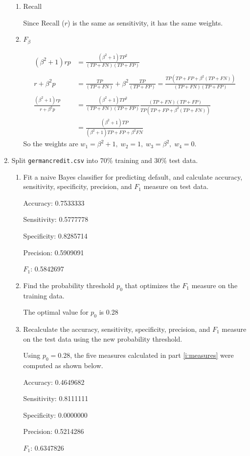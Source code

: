 \documentclass[11pt]{article}
\begin{document}
\begin{enumerate}
\begin{enumerate}
    \item Recall

          Since Recall ($r$) is the same as sensitivity, it has the same weights. 

    \item $F_\beta$

$$
\begin{array}{rl}
         (\beta^2 + 1)rp &= \frac{(\beta^2 + 1)TP^2}{(TP + FN)(TP + FP)}\\
& \\
         r + \beta^2p & = \frac{TP}{(TP + FN)} + \beta^2\frac{TP}{(TP + FP)} = \frac{TP(TP + FP + \beta^2(TP + FN)) }{(TP + FN)(TP + FP)}\\
&\\
\frac{(\beta^2 + 1)rp}{r + \beta^2 p} &= \frac{(\beta^2 + 1)TP^2}{(TP + FN)(TP + FP)}\frac{(TP + FN)(TP + FP)}{TP(TP + FP + \beta^2(TP + FN))}\\
 &= \frac{(\beta^2 + 1)TP}{(\beta^2 + 1)TP + FP + \beta^2 FN}
\end{array}
$$
So the weights are $w_1 = \beta^2 + 1,\; w_2 = 1,\; w_3 = \beta^2,\; w_4 = 0$.
  \end{enumerate}

\item Split \verb|germancredit.csv| into 70\% training and 30\% test data. 

  \begin{enumerate}
    \item \label{i:measures} Fit a naive Bayes classifier for predicting default, and calculate accuracy, sensitivity, 
    specificity, precision, and $F_1$ measure on test data. 

Accuracy: 0.7533333 

Sensitivity: 0.5777778 

Specificity: 0.8285714 

Precision: 0.5909091 

$F_1$: 0.5842697

    \item Find the probability threshold $p_0$ that optimizes the $F_1$ measure on the training data. 

    The optimal value for $p_0$ is 0.28

    \item Recalculate the accuracy, sensitivity, specificity, precision, and $F_1$ measure on the test 
    data using the new probability threshold. 

Using $p_0 = 0.28$, the five measures calculated in part \ref{i:measures} were computed as shown below. 

Accuracy: 0.4649682 

Sensitivity: 0.8111111 

Specificity: 0.0000000 

Precision: 0.5214286 

$F_1$: 0.6347826



  \end{enumerate}
\end{enumerate}
\end{document}
